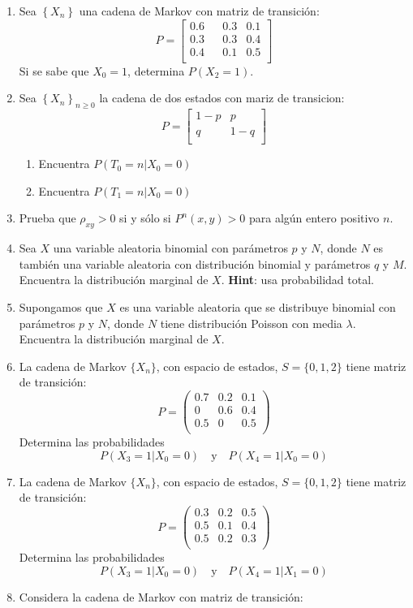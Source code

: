 \documentclass{report}
\begin{document}
\begin{enumerate}
\item Sea $\left\{X_n\right\}$ una cadena de Markov con matriz de transición:
$$P= \left[
    \begin{matrix}
        0.6 & & 0.3 & 0.1 \\
        0.3 & & 0.3 & 0.4 \\
        0.4 & & 0.1 & 0.5 \\
    \end{matrix}
    \right]
$$
Si se sabe que $X_0=1$, determina $P(X_2 = 1)$.
\item Sea $\left\{X_n\right\}_{n\geq 0}$ la cadena de dos estados con mariz de transicion:
$$P= \left[
    \begin{matrix}
        1-p &  p \\
        q   &  1-q \\
    \end{matrix}
    \right]
$$
\begin{enumerate}
    \item Encuentra $P(\left. T_0=n\right\vert X_0=0)$
    \item Encuentra $P(\left. T_1=n\right\vert X_0=0)$
\end{enumerate}
\item Prueba que $\rho_{xy}>0$ si y sólo si $P^n(x,y)>0$ para algún entero positivo $n$.
\item Sea $X$ una variable aleatoria binomial con parámetros $p$ y $N$, donde $N$ es también una variable aleatoria con distribución binomial y parámetros $q$ y $M$. Encuentra la distribución marginal de $X$. \textbf{Hint}: usa probabilidad total.
\item Supongamos que $X$ es una variable aleatoria que se distribuye binomial con parámetros $p$ y $N$, donde $N$ tiene distribución Poisson con media $\lambda$. Encuentra la distribución marginal de $X$. 
\item La cadena de Markov $\{X_n\}$, con espacio de estados, $S =\{0,1,2\}$ tiene matriz de transición:
$$
P = \left(\begin{matrix}
	0 .7 & 0.2 & 0.1 \\
	0    & 0.6 & 0.4 \\
	0 .5 & 0  & 0.5 \\
\end{matrix}\right)
$$
Determina las probabilidades 
$$
P(X_3=1\vert X_0=0)\quad \mbox{y}\quad P(X_4=1\vert X_0=0)
$$
\item La cadena de Markov $\{X_n\}$, con espacio de estados, $S =\{0,1,2\}$ tiene matriz de transición:
$$
P = \left(\begin{matrix}
	0 .3 & 0.2 & 0.5 \\
	0.5  & 0.1 & 0.4 \\
	0 .5 & 0.2  & 0.3 \\
\end{matrix}\right)
$$
Determina las probabilidades 
$$
P(X_3=1\vert X_0=0)\quad \mbox{y}\quad P(X_4=1\vert X_1=0)
$$
\item Considera la cadena de Markov con matriz de transición:


\end{enumerate}
\end{document}
